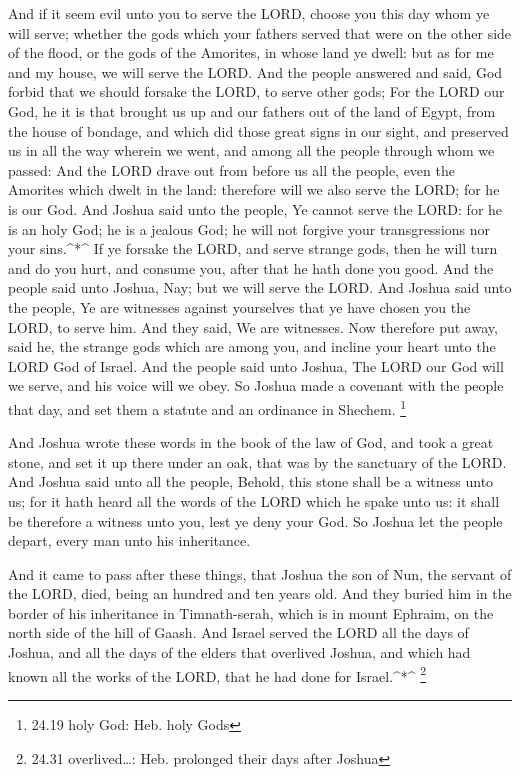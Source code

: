  And if it seem evil unto you to serve the LORD, choose you
this day whom ye will serve; whether the gods which your fathers served
that were on the other side of the flood, or the gods of the Amorites,
in whose land ye dwell: but as for me and my house, we will serve the
LORD.  And the people answered and said, God forbid that we
should forsake the LORD, to serve other gods;  For the LORD
our God, he it is that brought us up and our fathers out of the land of
Egypt, from the house of bondage, and which did those great signs in our
sight, and preserved us in all the way wherein we went, and among all
the people through whom we passed:  And the LORD drave out
from before us all the people, even the Amorites which dwelt in the
land: therefore will we also serve the LORD; for he is our God.
 And Joshua said unto the people, Ye cannot serve the LORD:
for he is an holy God; he is a jealous God; he will not forgive your
transgressions nor your sins.\^{}*\^{}  If ye forsake the
LORD, and serve strange gods, then he will turn and do you hurt, and
consume you, after that he hath done you good.  And the
people said unto Joshua, Nay; but we will serve the LORD. 
And Joshua said unto the people, Ye are witnesses against yourselves
that ye have chosen you the LORD, to serve him. And they said, We are
witnesses.  Now therefore put away, said he, the strange
gods which are among you, and incline your heart unto the LORD God of
Israel.  And the people said unto Joshua, The LORD our God
will we serve, and his voice will we obey.  So Joshua made
a covenant with the people that day, and set them a statute and an
ordinance in Shechem. \footnote{24.19 holy God: Heb. holy Gods}

 And Joshua wrote these words in the book of the law of
God, and took a great stone, and set it up there under an oak, that was
by the sanctuary of the LORD.  And Joshua said unto all the
people, Behold, this stone shall be a witness unto us; for it hath heard
all the words of the LORD which he spake unto us: it shall be therefore
a witness unto you, lest ye deny your God.  So Joshua let
the people depart, every man unto his inheritance.

 And it came to pass after these things, that Joshua the
son of Nun, the servant of the LORD, died, being an hundred and ten
years old.  And they buried him in the border of his
inheritance in Timnath-serah, which is in mount Ephraim, on the north
side of the hill of Gaash.  And Israel served the LORD all
the days of Joshua, and all the days of the elders that overlived
Joshua, and which had known all the works of the LORD, that he had done
for Israel.\^{}*\^{} \footnote{24.31 overlived\ldots: Heb. prolonged
  their days after Joshua}

